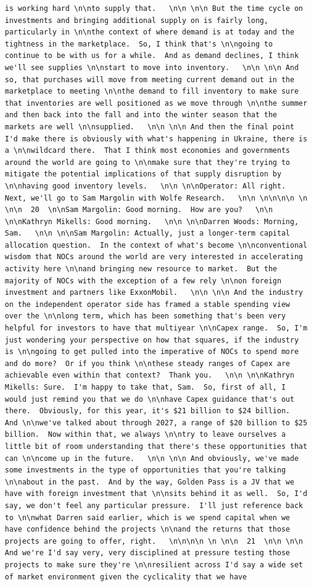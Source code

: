 \documentclass[
  letterpaper,
  DIV=11,
  numbers=noendperiod]{scrreprt}
\begin{document}
\begin{verbatim}
is working hard \n\nto supply that.   \n\n \n\n But the time cycle on investments and bringing additional supply on is fairly long, particularly in \n\nthe context of where demand is at today and the tightness in the marketplace.  So, I think that's \n\ngoing to continue to be with us for a while.  And as demand declines, I think we'll see supplies \n\nstart to move into inventory.   \n\n \n\n And so, that purchases will move from meeting current demand out in the marketplace to meeting \n\nthe demand to fill inventory to make sure that inventories are well positioned as we move through \n\nthe summer and then back into the fall and into the winter season that the markets are well \n\nsupplied.   \n\n \n\n And then the final point I'd make there is obviously with what's happening in Ukraine, there is a \n\nwildcard there.  That I think most economies and governments around the world are going to \n\nmake sure that they're trying to mitigate the potential implications of that supply disruption by \n\nhaving good inventory levels.   \n\n \n\nOperator: All right.  Next, we'll go to Sam Margolin with Wolfe Research.   \n\n \n\n\n\n \n \n\n  20  \n\nSam Margolin: Good morning.  How are you?   \n\n \n\nKathryn Mikells: Good morning.   \n\n \n\nDarren Woods: Morning, Sam.   \n\n \n\nSam Margolin: Actually, just a longer-term capital allocation question.  In the context of what's become \n\nconventional wisdom that NOCs around the world are very interested in accelerating activity here \n\nand bringing new resource to market.  But the majority of NOCs with the exception of a few rely \n\non foreign investment and partners like ExxonMobil.   \n\n \n\n And the industry on the independent operator side has framed a stable spending view over the \n\nlong term, which has been something that's been very helpful for investors to have that multiyear \n\nCapex range.  So, I'm just wondering your perspective on how that squares, if the industry is \n\ngoing to get pulled into the imperative of NOCs to spend more and do more?  Or if you think \n\nthese steady ranges of Capex are achievable even within that context?  Thank you.   \n\n \n\nKathryn Mikells: Sure.  I'm happy to take that, Sam.  So, first of all, I would just remind you that we do \n\nhave Capex guidance that's out there.  Obviously, for this year, it's $21 billion to $24 billion.  And \n\nwe've talked about through 2027, a range of $20 billion to $25 billion.  Now within that, we always \n\ntry to leave ourselves a little bit of room understanding that there's these opportunities that can \n\ncome up in the future.   \n\n \n\n And obviously, we've made some investments in the type of opportunities that you're talking \n\nabout in the past.  And by the way, Golden Pass is a JV that we have with foreign investment that \n\nsits behind it as well.  So, I'd say, we don't feel any particular pressure.  I'll just reference back to \n\nwhat Darren said earlier, which is we spend capital when we have confidence behind the projects \n\nand the returns that those projects are going to offer, right.   \n\n\n\n \n \n\n  21  \n\n \n\n And we're I'd say very, very disciplined at pressure testing those projects to make sure they're \n\nresilient across I'd say a wide set of market environment given the cyclicality that we have 
\end{verbatim}
\end{document}
